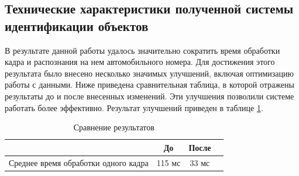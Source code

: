 \subsection{Технические характеристики полученной системы идентификации объектов}

В результате данной работы удалось значительно сократить время обработки кадра и распознания на нем автомобильного номера. Для достижения этого результата было внесено несколько значимых улучшений, включая оптимизацию работы с данными. Ниже приведена сравнительная таблица, в которой отражены результаты до и после внесенных изменений. Эти улучшения позволили системе работать более эффективно. Результат улучшений приведен в таблице \ref{tab:tab4}. 

\begin{table}    
    \caption{Сравнение результатов}
    \begin{tabularx}{\textwidth}{|X|c|c|c|}\hline
         & До & После\\ \hline
    Среднее время обработки одного кадра  & 115 мс   & 33 мс\\ \hline
    \end{tabularx}
    \label{tab:tab4}
\end{table}